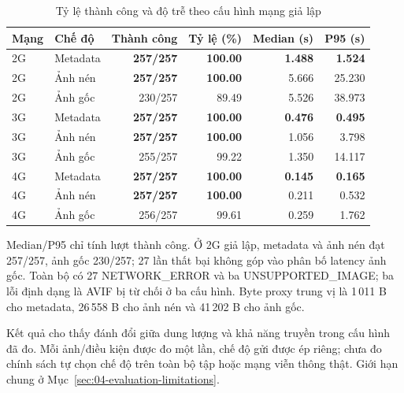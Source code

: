 \begin{table}[H]\centering
\caption{Tỷ lệ thành công và độ trễ theo cấu hình mạng giả lập}
\label{tab:weak-network-new-results}
\begin{tabular}{llrrrr}
\toprule Mạng & Chế độ & Thành công & Tỷ lệ (\%) & Median (s) & P95 (s) \\
\midrule
2G & Metadata & \textbf{257/257} & \textbf{100.00} & \textbf{1.488} & \textbf{1.524} \\
2G & Ảnh nén & \textbf{257/257} & \textbf{100.00} & 5.666 & 25.230 \\
2G & Ảnh gốc & 230/257 & 89.49 & 5.526 & 38.973 \\
3G & Metadata & \textbf{257/257} & \textbf{100.00} & \textbf{0.476} & \textbf{0.495} \\
3G & Ảnh nén & \textbf{257/257} & \textbf{100.00} & 1.056 & 3.798 \\
3G & Ảnh gốc & 255/257 & 99.22 & 1.350 & 14.117 \\
4G & Metadata & \textbf{257/257} & \textbf{100.00} & \textbf{0.145} & \textbf{0.165} \\
4G & Ảnh nén & \textbf{257/257} & \textbf{100.00} & 0.211 & 0.532 \\
4G & Ảnh gốc & 256/257 & 99.61 & 0.259 & 1.762 \\
\bottomrule
\end{tabular}
\end{table}
Median/P95 chỉ tính lượt thành công. Ở 2G giả lập, metadata và ảnh nén đạt 257/257, ảnh gốc 230/257; 27 lần thất bại không góp vào phân bố latency ảnh gốc. Toàn bộ có 27 NETWORK\_ERROR và ba UNSUPPORTED\_IMAGE; ba lỗi định dạng là AVIF bị từ chối ở ba cấu hình. Byte proxy trung vị là 1\,011 B cho metadata, 26\,558 B cho ảnh nén và 41\,202 B cho ảnh gốc.

Kết quả cho thấy đánh đổi giữa dung lượng và khả năng truyền trong cấu hình đã đo. Mỗi ảnh/điều kiện được đo một lần, chế độ gửi được ép riêng; chưa đo chính sách tự chọn chế độ trên toàn bộ tập hoặc mạng viễn thông thật. Giới hạn chung ở Mục~\ref{sec:04-evaluation-limitations}.
